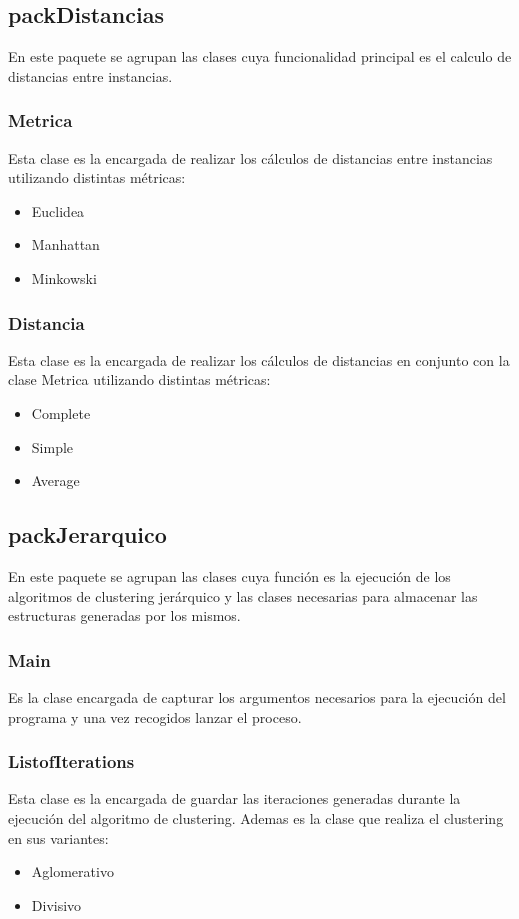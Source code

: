 \documentclass[11pt, titlepage,a4paper]{article}
\begin{document}
\subsection{packDistancias}
\label{packDistancias}
En este paquete se agrupan las clases cuya funcionalidad principal es el calculo
de distancias entre instancias.

\subsubsection{Metrica}
Esta clase es la encargada de realizar los cálculos de distancias entre
instancias utilizando distintas métricas:
\begin{itemize}
  \item Euclidea
  \item Manhattan
  \item Minkowski
\end{itemize}

\subsubsection{Distancia}
Esta clase es la encargada de realizar los cálculos de distancias en conjunto
con la clase Metrica utilizando distintas métricas:
\begin{itemize}
  \item Complete
  \item Simple
  \item Average
\end{itemize}

\subsection{packJerarquico}
En este paquete se agrupan las clases cuya función es la ejecución de los
algoritmos de clustering jerárquico y las clases necesarias para almacenar las
estructuras generadas por los mismos.

\subsubsection{Main}
Es la clase encargada de capturar los argumentos necesarios para la ejecución
del programa y una vez recogidos lanzar el proceso.
 
\subsubsection{ListofIterations}
Esta clase es la encargada de guardar las iteraciones generadas durante la
ejecución del algoritmo de clustering. Ademas es la clase que realiza el
clustering en sus variantes:
\begin{itemize}
  \item Aglomerativo
  \item Divisivo
\end{itemize}
\end{document}
